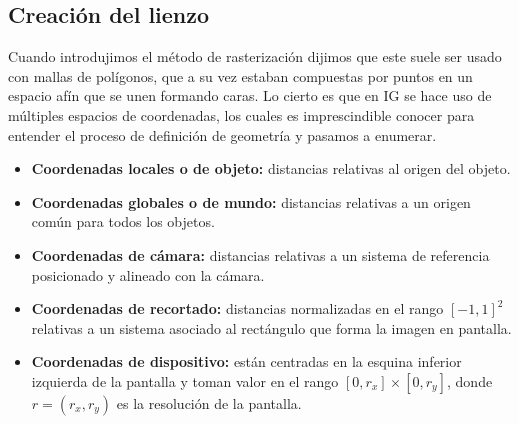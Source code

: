 \subsection{Creación del lienzo}\label{sec:lienzo} 
Cuando introdujimos el método de rasterización dijimos que este suele ser usado con mallas de polígonos, que a su vez estaban compuestas por puntos en un espacio afín que se unen formando caras. Lo cierto es que en IG se hace uso de múltiples espacios de coordenadas, los cuales es imprescindible conocer para entender el proceso de definición de geometría y pasamos a enumerar.
\begin{itemize}
    \item \textbf{Coordenadas locales o de objeto:} distancias relativas al origen del objeto.
    \item \textbf{Coordenadas globales o de mundo:} distancias relativas a un origen común para todos los objetos.
    \item \textbf{Coordenadas de cámara:} distancias relativas a un sistema de referencia posicionado y alineado con la cámara.
    \item \textbf{Coordenadas de recortado:} distancias normalizadas en el rango $[-1,1]^2$ relativas a un sistema asociado al rectángulo que forma la imagen en pantalla.
    \item \textbf{Coordenadas de dispositivo:} están centradas en la esquina inferior izquierda de la pantalla y toman valor en el rango $[0,r_x]\times [0,r_y]$, donde $r=(r_x,r_y)$ es la resolución de la pantalla.
\end{itemize}


